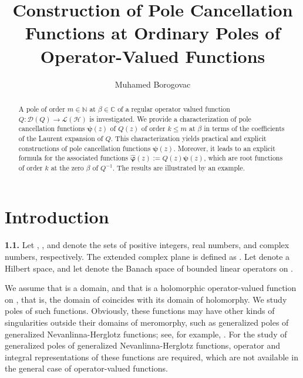\documentclass[11pt, reqno]{amsart}
\makeatletter
\theoremstyle{plain}
\theoremstyle{remark}
\newcounter{str}
\numberwithin{equation}{section}
\newcounter{mathrecordid}
\newcommand{\mathboxbegin}[1]{%
  \stepcounter{mathrecordid}%
  \immediate\write\mathrecords{\themathrecordid,#1}%
  \special{pdf:bann << /Type /Annot /Subtype /Link /Border [0 0 0]
    /MathBoxID \themathrecordid /F 2
    /A << /S /URI /URI (urn:mathbox:\themathrecordid) >> >>}}
\newcommand{\mathboxinlineplain}[1]{$#1$}
\newcommand{\mathboxinline}[1]{%
  $\mathboxbegin{inline}#1\special{pdf:eann}$}
\newcommand{\recordmath}{%
  \ifmeasuring@\expandafter\mathboxinlineplain
  \else\expandafter\mathboxinline\fi}
\makeatother
\begin{document}
\title[Construction of Pole Cancellation Functions]{Construction of Pole Cancellation Functions at Ordinary Poles of Operator-Valued Functions}
\author{Muhamed Borogovac}

\begin{abstract} 
A pole of order $m \in \mathbb{N}$ at $\beta \in \mathbb{C}$ of a regular operator valued function $Q : \mathcal{D}(Q) \to \mathcal{L}(\mathcal{H})$ is investigated. We provide a characterization of pole cancellation functions $\boldsymbol{\psi}(z)$ of $Q(z)$ of order $k \le m$ at $\beta$ in terms of the coefficients of the Laurent expansion of $Q$. This characterization yields practical and explicit constructions of pole cancellation functions $\boldsymbol{\psi}(z)$. Moreover, it leads to an explicit formula for the associated functions $\boldsymbol{\hat{\varphi}}(z) := Q(z)\boldsymbol{\psi}(z)$, which are root functions of order $k$ at the zero $\beta$ of $Q^{-1}$. The results are illustrated by an example.
\end{abstract}


\maketitle
\thispagestyle{empty}
\section{Introduction}\label{s2}

\textbf{1.1.}  Let \recordmath{\mathbb{N}}, \recordmath{\mathbb{R}}, and \recordmath{\mathbb{C}} denote the sets of positive integers, real numbers, and complex numbers, respectively. The extended complex plane is defined as \recordmath{\bar{\mathbb{C}} := \mathbb{C} \cup \{\infty\}}. Let \recordmath{\mathcal{H}} denote a Hilbert space, and let \recordmath{\mathcal{L}(\mathcal{H})} denote the Banach space of bounded linear operators on \recordmath{\mathcal{H}}. %

We assume that \recordmath{\mathcal{D}(Q) \subseteq \mathbb{C}} is a domain, and that \recordmath{Q : \mathcal{D}(Q) \to \mathcal{L}(\mathcal{H})} is a holomorphic operator-valued function on \recordmath{\mathcal{D}(Q)}, that is, the domain of \recordmath{Q} coincides with its domain of holomorphy. We study poles of such functions. Obviously, these functions may have other kinds of singularities outside their domains of meromorphy, such as generalized poles of generalized Nevanlinna-Herglotz functions; see, for example, \cite{Lu3}. For the study of generalized poles of generalized Nevanlinna-Herglotz
functions, operator and integral representations of these functions are required, which are not available in the general case of operator-valued functions.
\end{document}
